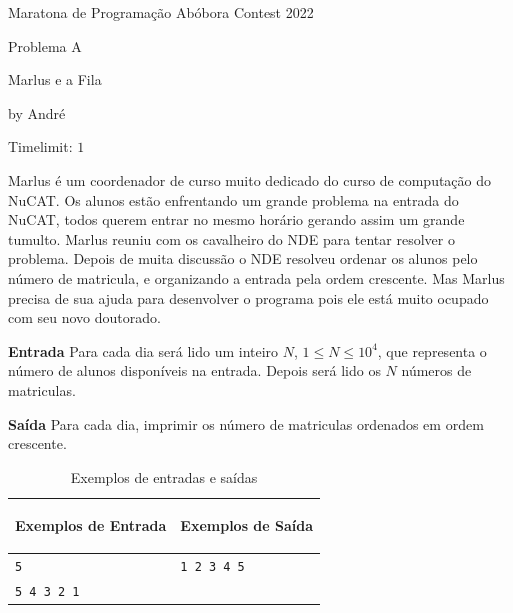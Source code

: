 \begin{center}
{{Maratona de Programação Abóbora Contest 2022}}

Problema A

Marlus e a Fila 

{\tiny by André}

Timelimit: $1$	
\end{center}			

Marlus é um coordenador de curso muito dedicado do curso de computação do NuCAT. Os alunos estão enfrentando um grande problema na entrada do NuCAT, todos querem entrar no mesmo horário gerando assim um grande tumulto. Marlus reuniu com os cavalheiro do NDE para tentar resolver o problema. Depois de muita discussão o NDE resolveu ordenar os alunos pelo número de matricula, e organizando a entrada pela ordem crescente. Mas Marlus precisa de sua ajuda para desenvolver o programa pois ele está muito ocupado com seu novo doutorado.

\vspace{0.3cm}
\textbf{Entrada}
Para cada dia será lido um inteiro $N$, $1 \leq  N  \leq  10^{4}$, que representa o número de alunos disponíveis na entrada. Depois será lido os $N$ números de matriculas.

\vspace{0.3cm}
\textbf{Saída}
Para cada dia, imprimir os  número de  matriculas ordenados em ordem crescente.

\begin{table}[h]
    \centering
    \begin{tabular}{|p{7cm}|p{7cm}|}
        \hline
        \begin{center}
            \vspace{-0.3cm}
            \textbf{Exemplos de Entrada}
            \vspace{-0.3cm}
        \end{center} 
         &  
        \begin{center}
            \vspace{-0.3cm}
            \textbf{Exemplos de Saída}
            \vspace{-0.3cm}
        \end{center} \\ \hline
         \texttt{5} & \texttt{1 2 3 4 5} \\  
         \texttt{5 4 3 2 1} & \texttt{} \\
         \hline
    \end{tabular}
    \caption{Exemplos de entradas e saídas}
    \label{tab:inputI}
\end{table}

\newpage

\begin{center}
\noindent

\end{center}